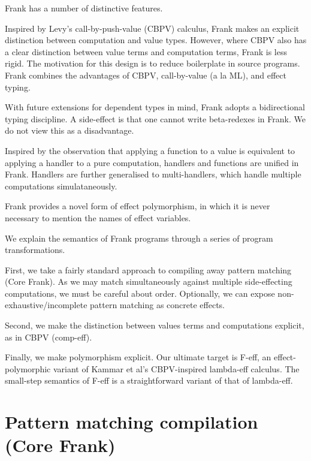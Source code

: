 \documentclass[preprint]{sigplanconf}
\begin{document}
Frank has a number of distinctive features.

Inspired by Levy's call-by-push-value (CBPV) calculus, Frank makes an
explicit distinction between computation and value types. However,
where CBPV also has a clear distinction between value terms and
computation terms, Frank is less rigid. The motivation for this design
is to reduce boilerplate in source programs. Frank combines the
advantages of CBPV, call-by-value (a la ML), and effect typing.

With future extensions for dependent types in mind, Frank adopts a
bidirectional typing discipline. A side-effect is that one cannot
write beta-redexes in Frank. We do not view this as a disadvantage.

Inspired by the observation that applying a function to a value is
equivalent to applying a handler to a pure computation, handlers and
functions are unified in Frank. Handlers are further generalised to
multi-handlers, which handle multiple computations simulataneously.

Frank provides a novel form of effect polymorphism, in which it is
never necessary to mention the names of effect variables.

We explain the semantics of Frank programs through a series of program
transformations.

First, we take a fairly standard approach to compiling away pattern
matching (Core Frank). As we may match simultaneously against multiple
side-effecting computations, we must be careful about
order. Optionally, we can expose non-exhaustive/incomplete pattern
matching as concrete effects.

Second, we make the distinction between values terms and computations
explicit, as in CBPV (comp-eff).

Finally, we make polymorphism explicit. Our ultimate target is F-eff,
an effect-polymorphic variant of Kammar et al's CBPV-inspired
lambda-eff calculus. The small-step semantics of F-eff is a
straightforward variant of that of lambda-eff.






\section{Pattern matching compilation (Core Frank)}
\end{document}
